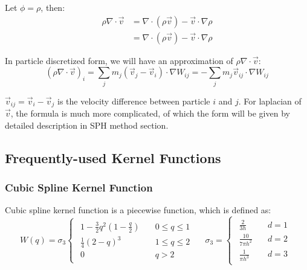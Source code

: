 Let $\phi = \rho$, 
then:
\begin{equation}
    \begin{aligned}
        \rho\nabla\cdot \vec{v} &= \nabla\cdot(\rho \vec{v}) - \vec{v}\cdot\nabla\rho\\
        &=
        \nabla\cdot(\rho \vec{v}) - \vec{v}\cdot\nabla\rho
    \end{aligned}
\end{equation}

In particle discretized form, we will have an approximation of $\rho\nabla\cdot \vec{v}$:
\begin{equation}
    \left(\rho\nabla\cdot \vec{v}\right)_i
    =
    \sum_j m_j
    (\vec{v}_j - \vec{v}_i)\cdot\nabla W_{ij}
    =-\sum_j m_j \vec{v}_{ij}\cdot\nabla W_{ij}
\end{equation}

$\vec{v}_{ij} = \vec{v}_i - \vec{v}_j$ is the velocity difference between particle $i$ and $j$.
For laplacian of $\vec{v}$,
the formula is much more complicated, 
of which the form will be given by detailed description in SPH method section.

\subsection{Frequently-used Kernel Functions}

\subsubsection{Cubic Spline Kernel Function}

Cubic spline kernel function is a piecewise function,
which is defined as:
\begin{equation}
    W(q)=\sigma_3
    \begin{cases}
        \begin{aligned}
            1-\frac{3}{2}q^2\left(1-\frac{q}{2}\right)\quad &0\leq q \leq 1 \\
            \frac{1}{4}(2-q)^3\quad &1\leq q \leq 2 \\
            0\quad &q > 2
        \end{aligned}
    \end{cases}\quad
    \sigma_3=
    \begin{cases}
        \begin{aligned}
            \frac{2}{3h} \quad &d=1 \\
            \frac{10}{7\pi h^2} \quad &d=2 \\
            \frac{1}{\pi h^3} \quad &d=3
        \end{aligned}
    \end{cases}
\end{equation}


